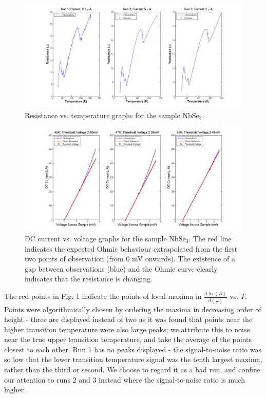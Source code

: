 \documentclass[aps,prl,nofootinbib,twocolumn,superscriptaddress,groupedaddress]{revtex4}  %
\begin{document}
\begin{center}
\begin{figure}[h]
\centering
\includegraphics[scale=0.5]{../Analysis/ResistivitiesVersusTemperature.png} 
\caption{Resistance vs. temperature graphs for the sample NbSe$_{3}$.}
\end{figure}

\begin{figure}[h]
\centering
\includegraphics[scale=0.5]{../Analysis/DCCurrentVersusVoltage.png} 
\caption{DC current vs. voltage graphs for the sample NbSe$_{3}$. The red line indicates the expected Ohmic behaviour extrapolated from the first two points of observation (from 0 mV onwards). The existence of a gap between observations (blue) and the Ohmic curve clearly indicates that the resistance is changing.}
\end{figure}
\end{center}

\twocolumngrid

\noindent The red points in Fig. 1 indicate the points of local maxima in $\frac{d \ln  (R)}{d \left(\frac{1}{T}\right)}$ vs. $T$. Points were algorithmically chosen by ordering the maxima in decreasing order of height - three are displayed instead of two as it was found that points near the higher transition temperature were also large peaks; we attribute this to noise near the true upper transition temperature, and take the average of the points closest to each other. Run 1 has no peaks displayed - the signal-to-noise ratio was so low that the lower transition temperature signal was the tenth largest maxima, rather than the third or second. We choose to regard it as a bad run, and confine our attention to runs 2 and 3 instead where the signal-to-noise ratio is much higher. 
\end{document}
